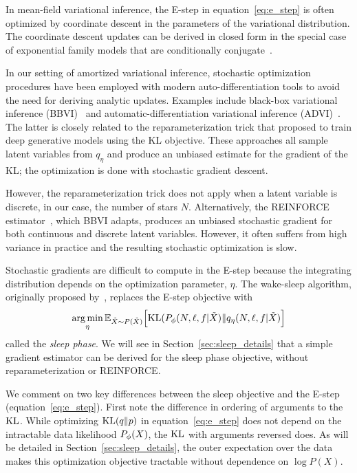 In mean-field variational inference, the E-step in equation~\eqref{eq:e_step} is often optimized by coordinate descent in the parameters of the variational distribution. 
The coordinate descent updates can be derived in closed form in the special case of exponential family models that are conditionally conjugate~\cite{Blei_2017_vi_review}. 

In our setting of amortized variational inference, stochastic 
optimization procedures have been employed with modern 
auto-differentiation tools to avoid the need for deriving 
analytic updates. Examples include black-box variational inference (BBVI)~\cite{ranganath2013black} 
and automatic-differentiation variational inference (ADVI)~\cite{kucukelbir2016automatic}. The latter 
is closely related to the reparameterization trick that \cite{kingma2013autoencoding, rezende2014stochastic} proposed to train deep generative models using the KL objective. 
These approaches all sample latent variables from $q_\eta$ and produce an unbiased estimate 
for the gradient of the KL; the optimization is done with stochastic gradient descent. 

However, the reparameterization trick does not apply when a latent variable is discrete, in our case, the number of stars $N$. Alternatively, the REINFORCE estimator~\cite{Williams1992reinforce}, which BBVI adapts, produces an unbiased stochastic gradient for both continuous and discrete latent variables. However, it often suffers from high variance in practice and the resulting stochastic optimization is slow. 

Stochastic gradients are difficult to compute in the E-step because the integrating distribution depends on the optimization parameter, $\eta$. 
The wake-sleep algorithm, originally proposed by~\cite{Hinton1995wake_sleep}, replaces the 
E-step objective with 
\begin{align}
    \operatorname*{arg\,min}_{\eta} \mathbb{E}_{\tilde X \sim P(\tilde X)}\Big[\textrm{KL}(P_\phi(N, \ell, f | \tilde X) \| q_\eta(N, \ell, f | \tilde X)\Big]
    \label{eq:sleep_obj}
\end{align}
called the {\itshape sleep phase}. We will see in Section~\ref{sec:sleep_details} that a simple gradient estimator can be derived for the sleep phase objective, without 
reparameterization or REINFORCE. 

We comment on two key differences between the sleep objective and the E-step (equation~\eqref{eq:e_step}). First note the difference in ordering of arguments to the $\textrm{KL}$. 
While optimizing $\textrm{KL}(q\|p)$ in equation~\eqref{eq:e_step} does not depend on the intractable 
data likelihood $P_\phi(X)$, the $\textrm{KL}$ with arguments reversed does. 
As will be detailed in Section~\ref{sec:sleep_details}, the outer expectation over the data makes this optimization objective tractable without dependence on $\log P(X)$. 

